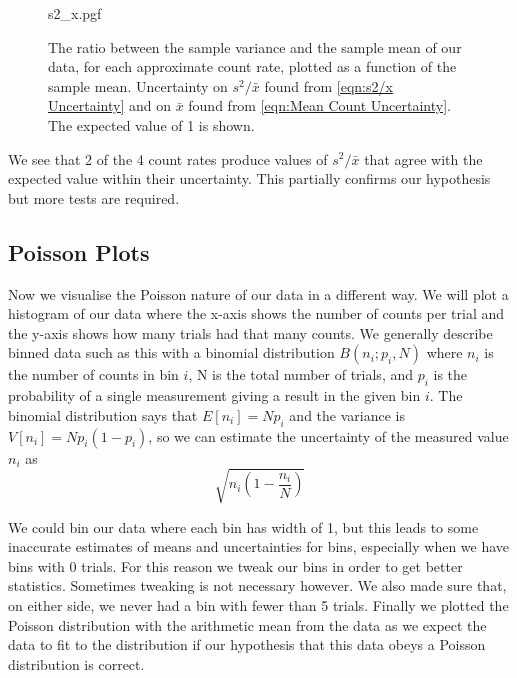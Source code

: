 \documentclass[12pt]{article}
\numberwithin{equation}{section}
\numberwithin{figure}{section}
\numberwithin{table}{section}
\begin{document}
\begin{figure}[H]
    \begin{center}
       {s2_x.pgf}
       \caption{The ratio between the sample variance and the sample mean of our data, for each approximate count rate, plotted as a function of the sample mean. Uncertainty on $s^2/\bar{x}$ found from \autoref{eqn:s2/x Uncertainty} and on $\bar{x}$ found from \autoref{eqn:Mean Count Uncertainty}. The expected value of 1 is shown.}
       \label{fig:s2_x}
    \end{center}
\end{figure}
\par We see that 2 of the 4 count rates produce values of $s^2/\bar{x}$ that agree with the expected value within their uncertainty. This partially confirms our hypothesis but more tests are required. 

\subsection{Poisson Plots}\label{sec:Poisson Plots}
\par Now we visualise the Poisson nature of our data in a different way. We will plot a histogram of our data where the x-axis shows the number of counts per trial and the y-axis shows how many trials had that many counts. We generally describe binned data such as this with a binomial distribution $B(n_i;p_i, N)$ where $n_i$ is the number of counts in bin $i$, N is the total number of trials, and $p_i$ is the probability of a single measurement giving a result in the given bin $i$. The binomial distribution says that $E[n_i]=Np_i$ and the variance is $V[n_i]=Np_i(1-p_i)$, so we can estimate the uncertainty of the measured value $n_i$ as 
\begin{equation}
    \sqrt{n_i\left(1-\frac{n_i}{N}\right)}
    \label{eqn:Bin Count Uncertainty}
\end{equation}
\par We could bin our data where each bin has width of 1, but this leads to some inaccurate estimates of means and uncertainties for bins, especially when we have bins with 0 trials. For this reason we tweak our bins in order to get better statistics. Sometimes tweaking is not necessary however. We also made sure that, on either side, we never had a bin with fewer than 5 trials. Finally we plotted the Poisson distribution with the arithmetic mean from the data as we expect the data to fit to the distribution if our hypothesis that this data obeys a Poisson distribution is correct. 
\end{document}
